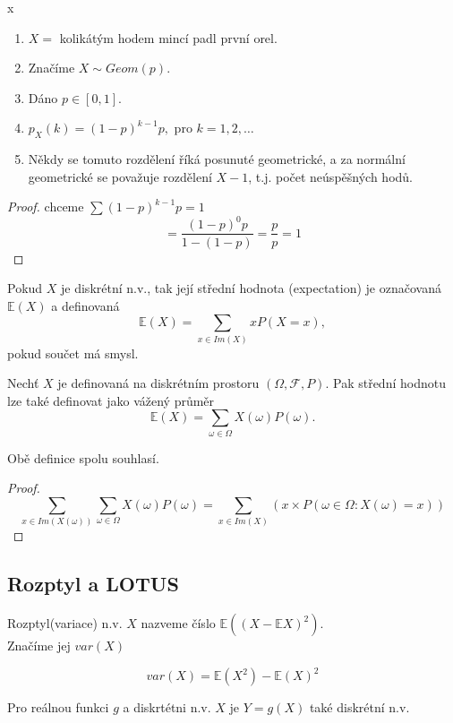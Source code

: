 \documentclass[../main.tex]{subfiles}
\begin{document}
\begin{definition} {\color{white} x}

    \begin{enumerate}
        \item $X =$ kolikátým hodem mincí padl první orel.
        \item Značíme $X \sim Geom(p)$.
        \item Dáno $p\in [0,1]$.
        \item $p_X(k) = (1-p)^{k-1}p,$ pro $k=1,2,\dots$
        \item Někdy se tomuto rozdělení říká posunuté geometrické, a za normální geometrické
        se považuje rozdělení $X-1$, t.j. počet neúspěšných hodů.
    \end{enumerate}
    \begin{proof}
        chceme $\sum (1-p)^{k-1}p = 1$
        \[= \frac{(1-p)^{0}p}{1- (1-p)} = \frac{p}{p} = 1\]
    \end{proof}
\end{definition}
\begin{definition}
    
    Pokud $X$ je diskrétní n.v., tak její střední hodnota (expectation) je označovaná $\mathbb{E}(X)$ a definovaná
    \[\mathbb{E}(X) = \sum_{x\in Im(X)}xP(X=x),\]
    pokud součet má smysl.
    
    Nechť $X$ je definovaná na diskrétním prostoru $(\Omega, \mathcal{F},P)$. Pak střední hodnotu lze také definovat jako vážený průměr
    \[\mathbb{E}(X) = \sum_{\omega \in \Omega} X(\omega)P({\omega}).\] 
\end{definition}

\begin{remark}
    Obě definice spolu souhlasí.
\end{remark}
\begin{proof}
    \[\sum_{x\in Im(X(\omega))} \sum_{\omega \in \Omega} X(\omega) P({\omega}) = \sum_{x\in Im(X)}(x\times P({\omega \in \Omega : X(\omega) = x}))\]
\end{proof}
\subsection{Rozptyl a LOTUS}
\begin{definition}[Rozptyl]

    Rozptyl(variace) n.v. $X$ nazveme číslo $\mathbb{E}((X-\mathbb{E}X)^2)$.\\
    Značíme jej $var(X)$

    \begin{theorem}
    \[var(X) = \mathbb{E}(X^2) - \mathbb{E}(X)^2\]
    \end{theorem}
\end{definition}
\begin{definition}

    Pro reálnou funkci $g$ a diskrtétni n.v. $X$ je $Y = g(X)$ také diskrétní n.v.
\end{definition}
\end{document}
